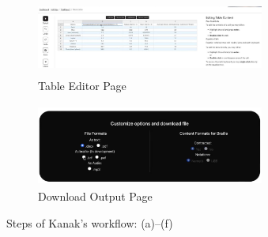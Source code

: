 \begin{figure}[!ht]
  \vspace{1em}

    \begin{subfigure}[t]{0.48\textwidth}
    \includegraphics[width=75mm, height=25mm]{images/tableeditor2.png}
    \caption{Table Editor Page}
  \end{subfigure}
    \hfill
   \begin{subfigure}[t]{0.48\textwidth}
    \includegraphics[width=75mm, height=27mm]{images/last2.png}
    \caption{Download Output Page}
  \end{subfigure}

  \caption{Steps of Kanak's workflow: (a)–(f)}
  \label{fig:kanak-workflow}
\end{figure}